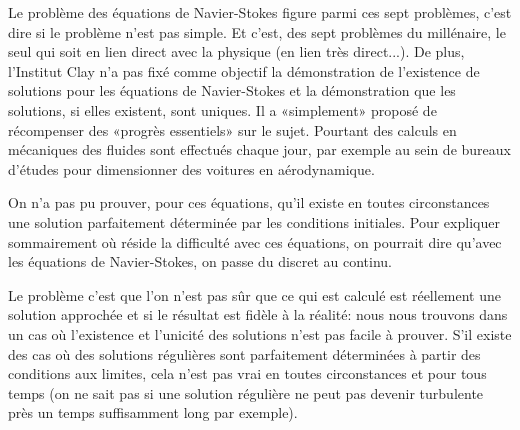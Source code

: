 \begin{histoire}
\medskip
Le problème des équations de Navier-Stokes  figure parmi ces sept problèmes, c'est dire si le problème n'est pas simple. Et c'est, des sept problèmes du millénaire, le seul qui soit en lien direct avec la physique (en lien très direct...). De plus, l'Institut Clay n'a pas fixé comme objectif la démonstration de l'existence de solutions pour les équations de Navier-Stokes et la démonstration que les solutions, si elles existent, sont uniques. Il a «simplement» proposé de récompenser des «progrès essentiels» sur le sujet. Pourtant des calculs en mécaniques des fluides sont effectués chaque jour, par exemple au sein de bureaux d'études pour dimensionner des voitures en aérodynamique.

On n'a pas pu prouver, pour ces équations, qu'il existe en toutes circonstances une solution parfaitement déterminée par les conditions initiales. Pour expliquer sommairement où réside la difficulté avec ces équations, on pourrait dire qu'avec les équations de Navier-Stokes, on passe du discret au continu.

\medskip
Le problème c'est que l'on n'est pas sûr que ce qui est calculé est réellement une solution approchée et si le résultat est fidèle à la réalité: nous nous trouvons dans un cas où l'existence et l'unicité des solutions n'est pas facile à prouver. S'il existe des cas où des solutions régulières sont parfaitement déterminées à partir des conditions aux limites, cela n'est pas vrai en toutes circonstances et pour tous temps (on ne sait pas si une solution régulière ne peut pas devenir turbulente près un temps suffisamment long par exemple).


\end{histoire}
